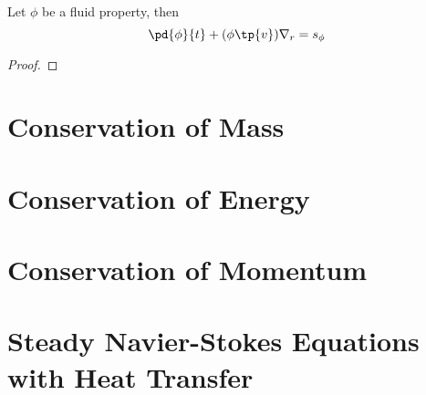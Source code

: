 \begin{thm}
Let $\phi$ be a fluid property,  then
\begin{equation}
    \pd{\phi}{t} + ( \phi \tp{v} ) \nabla_r = s_\phi
\end{equation}
\end{thm}
\begin{proof}

\end{proof}




\section{Conservation of Mass}
\section{Conservation of Energy}
\section{Conservation of Momentum}
\section{Steady Navier-Stokes Equations with Heat Transfer}
